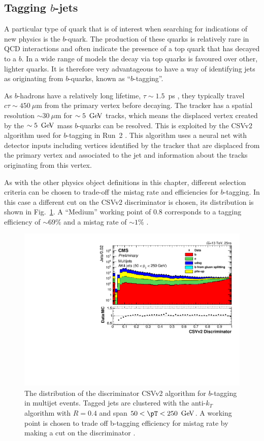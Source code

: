 \subsection{Tagging $b$-jets}

A particular type of quark that is of interest when searching for
indications of new physics is the $b$-quark. The production of these
quarks is relatively rare in \SM QCD interactions and often
indicate the presence of a top quark that has decayed to a
$b$. In a wide range of \SUSY models the decay via top quarks is
favoured over other, lighter quarks. It is therefore very advantageous
to have a way of identifying jets as originating from $b$-quarks,
known as ``$b$-tagging''.

As $b$-hadrons have a relatively long lifetime, $\tau\sim 1.5$~ps
\cite{PhysRevD.86.010001}, they typically travel $c\tau\sim 450~\mu$m
from the primary vertex before decaying. The \CMS tracker has a
spatial resolution $\sim 30~\mu$m for $\sim 5~\mathrm{\,Ge\kern -0.1em V}$ tracks, which
means the displaced vertex created by the $\sim 5~\mathrm{\,Ge\kern -0.1em V}$ mass $b$-quarks
can be resolved. This is exploited by the \ac{CSVv2} algorithm used
for $b$-tagging in Run~2 \cite{CMS-PAS-BTV-15-001}. This algorithm
uses a neural net with detector inputs including vertices identified
by the tracker that are displaced from the primary vertex and
associated to the jet and information about the tracks originating
from this vertex.

As with the other physics object definitions in this chapter,
different selection criteria can be chosen to trade-off the mistag
rate and efficiencies for $b$-tagging. In this case a different cut on
the \ac{CSVv2} discriminator is chosen, its distribution is shown in
Fig.~\ref{fig:bTag}. A ``Medium'' working point of 0.8 corresponds to
a tagging efficiency of $\sim 69\%$ and a mistag rate of $\sim 1\%$
\cite{CMS-PAS-BTV-15-001}. 

\begin{figure}
\begin{center}
\includegraphics[width=0.5\linewidth]{figs/reconstruction/bTag} \end{center}
\caption{ The distribution of the discriminator \ac{CSVv2} algorithm
for $b$-tagging in multijet events. Tagged jets are clustered with the
anti-$k_T$ algorithm with $R=0.4$ and span $50<\pT<250~\gev$. A
working point is chosen to trade off b-tagging efficiency for mistag
rate by making a cut on the discriminator \cite{CMS-PAS-BTV-15-001}.}
\label{fig:bTag} \end{figure}

